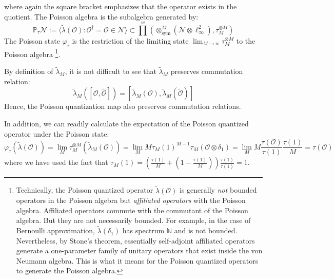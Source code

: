 \documentclass[a4paper,11pt]{article}
\theoremstyle{definition}
\numberwithin{equation}{section}
\begin{document}
where again the square bracket emphasizes that the operator exists in the quotient. The Poisson algebra is the subalgebra generated by:
\begin{equation}
    \mathbb{P}_\tau\mathcal{N}:=\langle\widetilde{\lambda}(\mathcal{O}):\mathcal{O}^\dagger =\mathcal{O}\in\mathcal{N}\rangle\subset\prod^w(\otimes_\text{sym}^M(\mathcal{N}\otimes\ell_\infty^2), \tau_M^{\otimes M})
\end{equation}
The Poisson state $\varphi_\tau$ is the restriction of the limiting state $\lim_{M\rightarrow w}\tau_M^{\otimes M}$ to the Poisson algebra \footnote{Technically, the Poisson quantized operator $\widetilde{\lambda}(\mathcal{O})$ is generally \textit{not} bounded operators in the Poisson algebra but \textit{affiliated operators} with the Poisson algebra. Affiliated operators commute with the commutant of the Poisson algebra. But they are not necessarily bounded. For example, in the case of Bernoulli approximation, $\widetilde{\lambda}(\delta_1)$ has spectrum $\mathbb{N}$ and is not bounded. Nevertheless, by Stone's theorem, essentially self-adjoint affiliated operators generate a one-parameter family of unitary operators that exist inside the von Neumann algebra. This is what it means for the Poisson quantized operators to generate the Poisson algebra.}.

By definition of $\widetilde{\lambda}_M$, it is not difficult to see that $\widetilde{\lambda}_M$ preserves commutation relation:
\begin{equation}
    \widetilde{\lambda}_M([\mathcal{O},\widetilde{\mathcal{O}}]) = [\widetilde{\lambda}_M(\mathcal{O}), \widetilde{\lambda}_M(\widetilde{\mathcal{O}})]
\end{equation}
Hence, the Poisson quantization map also preserves commutation relations. 

In addition, we can readily calculate the expectation of the Poisson quantized operator under the Poisson state:
\begin{equation}
    \varphi_\tau(\widetilde{\lambda}(\mathcal{O})) = \lim_M \tau_M^{\otimes M}(\widetilde{\lambda}_M(\mathcal{O})) = \lim_M M\tau_M(1)^{M-1}\tau_M(\mathcal{O}\otimes\delta_1) = \lim_M M\frac{\tau(\mathcal{O})}{\tau(1)}\frac{\tau(1)}{M} = \tau(\mathcal{O})
\end{equation}
where we have used the fact that $\tau_M(1) = (\frac{\tau(1)}{M} + (1 - \frac{\tau(1)}{M}))\frac{\tau(1)}{\tau(1)} = 1$.
\end{document}
